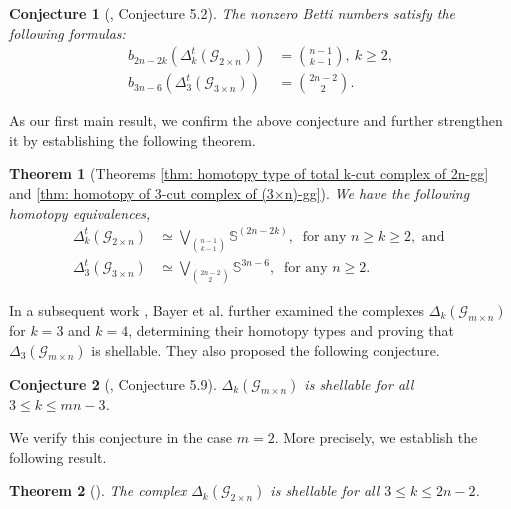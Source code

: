 \documentclass[11pt,reqno,a4paper]{amsart}
\newtheorem{theorem}{Theorem}[section]
\newtheorem{conjecture}{Conjecture}[section]
\theoremstyle{definition}
\theoremstyle{theorem}
\newcommand{\totalkcut}{\Delta_{k}^t}
\newcommand{\totalthreecut}{\Delta_{3}^t}
\newcommand{\kcut}{\Delta_{k}}
\newcommand{\twogg}{\mathcal{G}_{2\times n}}
\newcommand{\mgg}{\mathcal{G}_{m\times n}}
\newcommand{\threegg}{\mathcal{G}_{3\times n}}
\newcommand{\lno}{\left(}
\newcommand{\rno}{\right)}
\newcommand{\bbS}{\mathbb{S}}
\theoremstyle{remark}
\begin{document}
\begin{conjecture}[\cite{bayer2024total}, Conjecture 5.2] 
 The nonzero Betti numbers satisfy the following formulas:
        \begin{equation*}
            \begin{split}
                b_{2n-2k}(\Delta_k^t(\twogg))& =\binom{n-1}{k-1}, ~k\geq 2,\\
                b_{3n-6}(\Delta_3^t(\threegg))& =\binom{2n-2}{2}.
            \end{split}
        \end{equation*}
\end{conjecture}

As our first main result, we confirm the above conjecture and further strengthen it by establishing the following theorem.

\begin{theorem}[Theorems \ref{thm: homotopy type of total k-cut complex of 2n-gg} and \ref{thm: homotopy of 3-cut complex of (3×n)-gg}]

We have the following homotopy equivalences, 
\begin{equation*}
            \begin{split}
                \totalkcut\lno \twogg\rno& \simeq \bigvee\limits_{\binom{n-1}{k-1}} \bbS^{\lno 2n-2k\rno}, ~ \text { for any } n\geq k\geq 2, \text{ and }\\
                \totalthreecut \lno \threegg \rno& \simeq\bigvee\limits_{\binom{2n-2}{2}}\bbS^{3n-6}, ~ \text { for any } n\geq 2.
            \end{split}
\end{equation*}
\end{theorem}

In a subsequent work \cite{bayer2024cutB}, Bayer et al. further examined the complexes $\Delta_k(\mgg)$ for $k = 3$ and $k = 4$, determining their homotopy types and proving that $\Delta_3(\mgg)$ is shellable. They also proposed the following conjecture.

\begin{conjecture}[\cite{bayer2024cutB}, Conjecture 5.9]  $\Delta_k(\mgg)$ is shellable for all $3 \leq k \leq mn -3$.
\end{conjecture}

We verify this conjecture in the case $m=2$. More precisely, we establish the following result.

\begin{theorem}[]
   The complex $\kcut \lno \twogg \rno$ is shellable for all $ 3 \leq k \leq 2n-2 $. 
\end{theorem}
\end{document}
